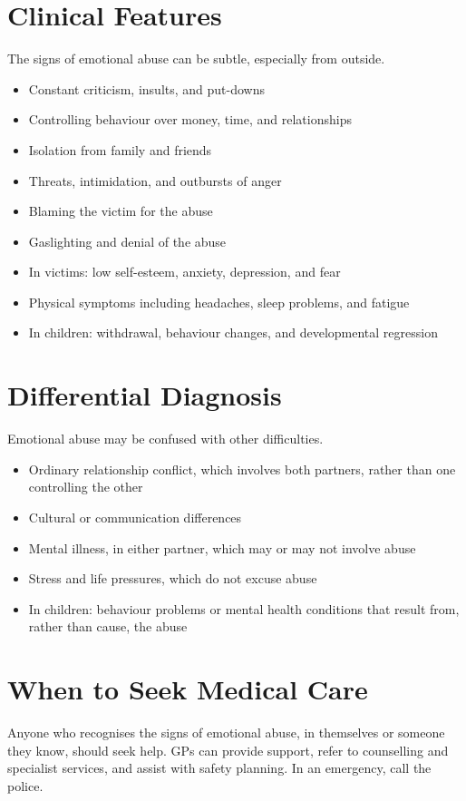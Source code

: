 \section*{Clinical Features}
The signs of emotional abuse can be subtle, especially from outside.
\begin{itemize}
    \item Constant criticism, insults, and put-downs
    \item Controlling behaviour over money, time, and relationships
    \item Isolation from family and friends
    \item Threats, intimidation, and outbursts of anger
    \item Blaming the victim for the abuse
    \item Gaslighting and denial of the abuse
    \item In victims: low self-esteem, anxiety, depression, and fear
    \item Physical symptoms including headaches, sleep problems, and fatigue
    \item In children: withdrawal, behaviour changes, and developmental regression
\end{itemize}

\section*{Differential Diagnosis}
Emotional abuse may be confused with other difficulties.
\begin{itemize}
    \item Ordinary relationship conflict, which involves both partners, rather than one controlling the other
    \item Cultural or communication differences
    \item Mental illness, in either partner, which may or may not involve abuse
    \item Stress and life pressures, which do not excuse abuse
    \item In children: behaviour problems or mental health conditions that result from, rather than cause, the abuse
\end{itemize}

\section*{When to Seek Medical Care}
Anyone who recognises the signs of emotional abuse, in themselves or someone they know, should seek help. GPs can provide support, refer to counselling and specialist services, and assist with safety planning. In an emergency, call the police.

